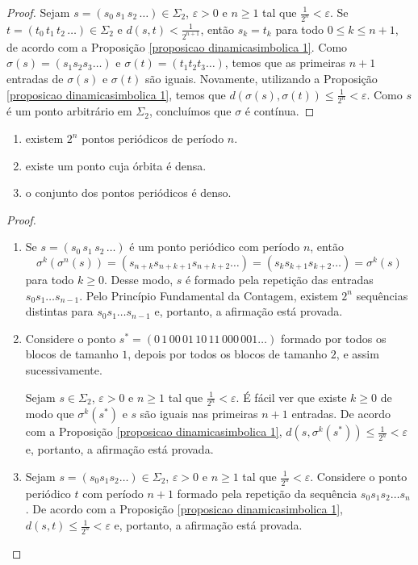 \begin{proof}
Sejam $s = (s_0\, s_1\, s_2\, \dots) \in \Sigma_2$, $\varepsilon > 0$ e $n \geq 1$ tal que $\frac{1}{2^n} < \varepsilon$. Se $t = (t_0\, t_1\, t_2\, \dots) \in \Sigma_ 2$ e $d(s, t) < \frac{1}{2^{n+1}}$, então $s_k = t_k$ para todo $0 \leq k \leq n+1$, de acordo com a Proposição  \ref{proposicao dinamicasimbolica 1}. Como $\sigma(s) = (s_1s_2s_3\dots)$ e $\sigma(t) = (t_1t_2t_3\dots)$, temos que as primeiras $n+1$ entradas de $\sigma(s)$ e $\sigma(t)$ são iguais. Novamente, utilizando a Proposição \ref{proposicao dinamicasimbolica 1}, temos que $d(\sigma(s), \sigma(t)) \leq \frac{1}{2^n} < \varepsilon$. Como $s$ é um ponto arbitrário em $\Sigma_2$, concluímos que $\sigma$ é contínua.
\end{proof}

\begin{proposition}
\begin{enumerate}
\item existem $2^n$ pontos periódicos de período $n$.
\item existe um ponto cuja órbita é densa.
\item o conjunto dos pontos periódicos é denso.
\end{enumerate}
\end{proposition}

\begin{proof}
\begin{enumerate}
\item Se $s = (s_0\, s_1\, s_2\, \dots)$ é um ponto periódico com período $n$, então
$$\sigma^k(\sigma^n(s)) = (s_{n+k}s_{n+k+1}s_{n+k+2}\dots) = (s_ks_{k+1}s_{k+2}\dots) = \sigma^k(s)$$
para todo $k \geq 0$. Desse modo, $s$ é formado pela repetição das entradas $s_0 s_1 \dots s_{n-1}$. Pelo Princípio Fundamental da Contagem, existem $2^n$ sequências distintas para  $s_0 s_1 \dots s_{n-1}$ e, portanto, a afirmação está provada.

\item Considere o ponto $s^* = (0 \, 1 \, 0 0 \, 0 1 \, 1 0 \, 1 1 \, 0 0 0 \, 0 0 1 \dots)$ formado por todos os blocos de tamanho $1$, depois por todos os blocos de tamanho $2$, e assim sucessivamente. 

Sejam $s \in \Sigma_2$, $\varepsilon > 0$ e $n \geq 1$ tal que $\frac{1}{2^n} < \varepsilon$. É fácil ver que existe $k \geq 0$ de modo que $\sigma^k(s^*)$ e $s$ são iguais nas primeiras $n+1$ entradas. De acordo com a Proposição \ref{proposicao dinamicasimbolica 1}, $d(s, \sigma^k(s^*)) \leq \frac{1}{2^n} < \varepsilon$ e, portanto, a afirmação está provada.

\item Sejam $s = (s_0 s_1 s_2 \dots) \in \Sigma_2$, $\varepsilon > 0$ e $n \geq 1$ tal que $\frac{1}{2^n} < \varepsilon$. Considere o ponto periódico $t$ com período $n+1$ formado pela repetição da sequência $s_0 s_1 s_2 \dots s_n$. De acordo com a Proposição \ref{proposicao dinamicasimbolica 1}, $d(s, t) \leq \frac{1}{2^n} < \varepsilon$ e, portanto, a afirmação está provada.
\end{enumerate}
\end{proof}
